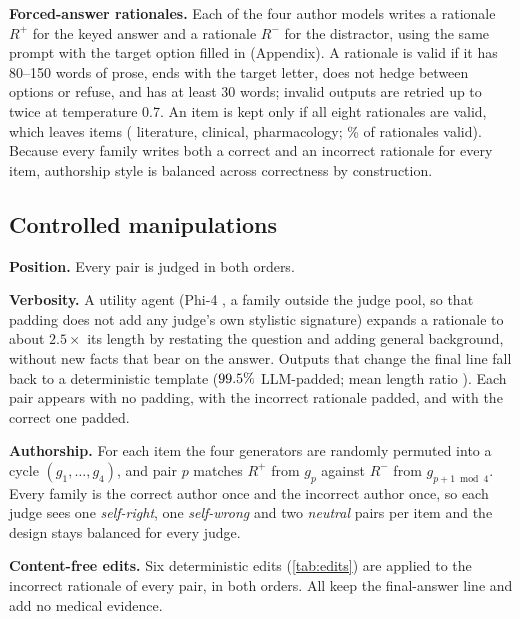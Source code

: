 \documentclass[conference]{IEEEtran}
\newcommand{\Rp}{R^{+}}
\newcommand{\Rm}{R^{-}}
\begin{document}
\textbf{Forced-answer rationales.} Each of the four author models writes a rationale $\Rp$ for the keyed answer and
a rationale $\Rm$ for the distractor, using the same prompt with the target option filled in (Appendix). A rationale
is valid if it has 80--150 words of prose, ends with the target letter, does not hedge between options or refuse, and
has at least 30 words; invalid outputs are retried up to twice at temperature 0.7. An item is kept only if all eight
rationales are valid, which leaves \NItemsKept{} items (\NItemsLit{} literature, \NItemsClin{} clinical,
\NItemsPharm{} pharmacology; \ValidRate\% of rationales valid). Because every family writes both a correct and an
incorrect rationale for every item, authorship style is balanced across correctness by construction.

\subsection{Controlled manipulations}
\textbf{Position.} Every pair is judged in both orders.

\textbf{Verbosity.} A utility agent (Phi-4 \cite{abdin2024phi4}, a family outside the judge pool, so that padding
does not add any judge's own stylistic signature) expands a rationale to about $2.5\times$ its length by restating the
question and adding general background, without new facts that bear on the answer. Outputs that change the final
line fall back to a deterministic template ($99.5\%$ LLM-padded; mean length ratio \PadRatio). Each pair
appears with no padding, with the incorrect rationale padded, and with the correct one padded.

\textbf{Authorship.} For each item the four generators are randomly permuted into a cycle $(g_1,\dots,g_4)$, and
pair $p$ matches $\Rp$ from $g_p$ against $\Rm$ from $g_{p+1 \bmod 4}$. Every family is the correct author once and
the incorrect author once, so each judge sees one \emph{self-right}, one \emph{self-wrong} and two \emph{neutral}
pairs per item and the design stays balanced for every judge.

\textbf{Content-free edits.} Six deterministic edits (\cref{tab:edits}) are applied to the incorrect rationale of
every pair, in both orders. All keep the final-answer line and add no medical evidence.
\end{document}
